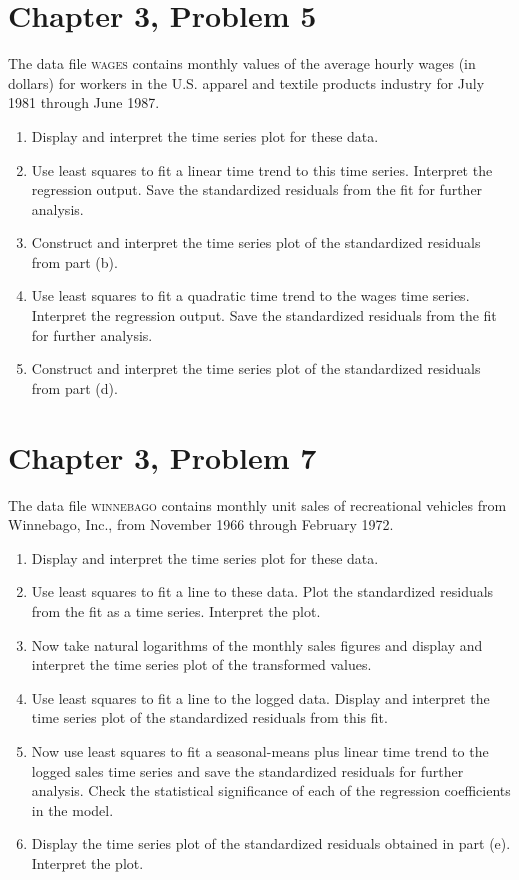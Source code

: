 \documentclass[11pt]{article}
\newif\ifclearpage
\newcommand{\problem}[1]{\section*{#1}}
\newcommand{\solution}{\hrulefill}
\newcommand{\maybeclearpage}{\ifclearpage\clearpage\fi}
\begin{document}
\maybeclearpage
\problem{Chapter 3, Problem 5}
The data file \textsc{wages} contains monthly values of the average hourly wages (in dollars) for workers in the U.S. apparel and textile products industry for July 1981 through June 1987.
\begin{enumerate}
	\item Display and interpret the time series plot for these data.
	\item Use least squares to fit a linear time trend to this time series. Interpret the regression output.  Save the standardized residuals from the fit for further analysis. 
	\item Construct and interpret the time series plot of the standardized residuals from part (b). 
	\item Use least squares to fit a quadratic time trend to the wages time series. Interpret the regression output. Save the standardized residuals from the fit for further analysis.
	\item Construct and interpret the time series plot of the standardized residuals from part (d).
\end{enumerate}

\solution


\maybeclearpage
\problem{Chapter 3, Problem 7}
The data file \textsc{winnebago} contains monthly unit sales of recreational vehicles from Winnebago, Inc., from November 1966 through February 1972.
\begin{enumerate}
	\item Display and interpret the time series plot for these data.
	\item Use least squares to fit a line to these data. Plot the standardized residuals from the fit as a time series. Interpret the plot.
	\item Now take natural logarithms of the monthly sales figures and display and interpret the time series plot of the transformed values.
	\item Use least squares to fit a line to the logged data. Display and interpret the time series plot of the standardized residuals from this fit.
	\item Now use least squares to fit a seasonal-means plus linear time trend to the logged sales time series and save the standardized residuals for further analysis. Check the statistical significance of each of the regression coefficients in the model.
	\item Display the time series plot of the standardized residuals obtained in  part (e). Interpret the plot.
\end{enumerate}

\solution

\maybeclearpage
\end{document}
